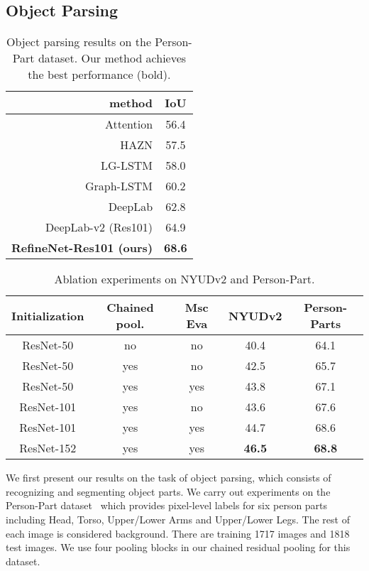 \documentclass[10pt,twocolumn,letterpaper]{article}
\def\best{\bf \cellcolor[gray]{0.85}}
\def\secbest{\cellcolor[gray]{0.92} }
\begin{document}
\subsection{Object Parsing}
\label{sec:object-parsing}

\begin{table}[t]
\caption{Object parsing results on the Person-Part dataset.
Our method achieves the best performance (bold).
}
\centering
\resizebox{.5\linewidth}{!}
  {
  \begin{tabular}{ r |  c }
method  & IoU\\ \hline \hline
Attention \cite{chen2015attention} & 56.4 \\
HAZN \cite{xia2015zoom} & 57.5 \\
LG-LSTM \cite{liang2015semantic} & 58.0 \\
Graph-LSTM \cite{liang2016semantic} & 60.2 \\
DeepLab \cite{ChenPKMY14}  &  62.8 \\
DeepLab-v2 (Res101) \cite{ChenPK0Y16}  & 64.9 \\ \hline \hline
\bf RefineNet-Res101 (ours) & \best 68.6

 \end{tabular}
  }
\label{tab:personpart}
\end{table}


\begin{table}[t]
\caption{Ablation experiments on NYUDv2 and Person-Part.
}
\centering
\resizebox{.95\linewidth}{!}
  {
  \begin{tabular}{ c   c  c | c  c  }
Initialization  & Chained pool.  &Msc Eva & NYUDv2 & Person-Parts \\ \hline \hline
ResNet-50  &no &no &40.4 & 64.1 \\
ResNet-50  &yes  &no &42.5 & 65.7 \\
ResNet-50  &yes  &yes  &43.8 & 67.1\\ \hline
ResNet-101 &yes  &no  &43.6 & 67.6\\
ResNet-101 &yes  &yes  &\secbest 44.7 &\secbest 68.6\\ \hline
ResNet-152 &yes  &yes  & \best 46.5 & \best 68.8\\
 \end{tabular}
  }
\label{tab:nyud_ablation}
\end{table}


We first present our results on the task of object parsing, which consists of recognizing and segmenting object parts.
We carry out experiments on the Person-Part dataset~\cite{chen2014detect,chen2015attention} which provides pixel-level labels for six person parts including
Head, Torso, Upper/Lower Arms and Upper/Lower Legs. The rest of each image is considered background. There are training 1717 images and 1818 test images.
We use four pooling blocks in our chained residual pooling for this dataset.
\end{document}
